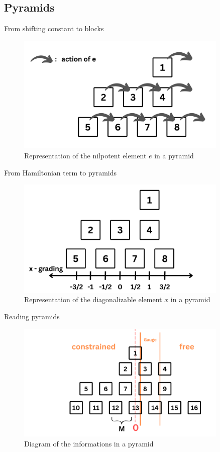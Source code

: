 \documentclass{beamer}
\begin{document}
\subsection{Pyramids}


\begin{frame}{From shifting constant to blocks}
    \begin{figure}
        \centering
        \includegraphics[width=0.9\textwidth]{pyramid}
        \caption{Representation of the nilpotent element $e$ in a pyramid}
    \end{figure}
\end{frame}

\begin{frame}{From Hamiltonian term to pyramids}
    \begin{figure}
        \centering
        \includegraphics[width=0.9\textwidth]{pyramid2}
        \caption{Representation of the diagonalizable element $x$ in a pyramid}
    \end{figure}
\end{frame}

\begin{frame}{Reading pyramids}
    \begin{figure}
        \centering
        \includegraphics[width=0.9\textwidth]{readingpyramids}
        \caption{Diagram of the informations in a pyramid}
    \end{figure}
\end{frame}
\end{document}
